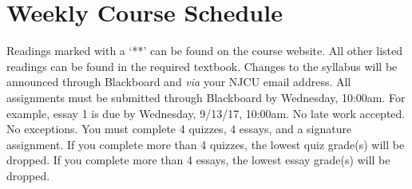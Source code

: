 \documentclass[article,oneside]{memoir}
\begin{document}
\section{Weekly Course Schedule}
Readings marked with a `**' can be found on the course website. All other listed readings can be found in the required textbook. Changes to the syllabus will be announced through Blackboard and \emph{via} your NJCU email address.  All assignments must be submitted through Blackboard by Wednesday, 10:00am. For example, essay 1 is due by Wednesday, 9/13/17, 10:00am. No late work accepted. No exceptions. You must complete 4 quizzes, 4 essays, and a signature assignment.  If you complete more than 4 quizzes, the lowest quiz grade(s) will be dropped. If you complete more than 4 essays, the lowest essay grade(s) will be dropped.   \newline
\end{document}
